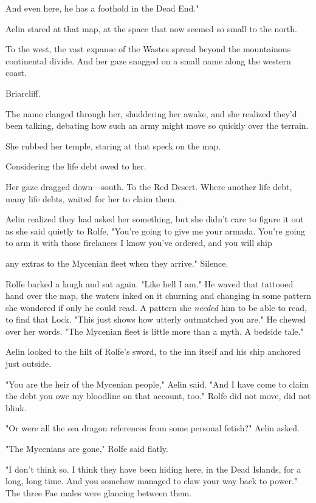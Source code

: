 And even here, he has a foothold in the Dead End."

Aelin stared at that map, at the space that now seemed so small to the north.

To the west, the vast expanse of the Wastes spread beyond the mountainous continental divide. And her gaze snagged on a small name along the western coast.

Briarcliff.

The name clanged through her, shuddering her awake, and she realized they'd been talking, debating how such an army might move so quickly over the terrain.

She rubbed her temple, staring at that speck on the map.

Considering the life debt owed to her.

Her gaze dragged down---south. To the Red Desert. Where another life debt, many life debts, waited for her to claim them.

Aelin realized they had asked her something, but she didn't care to figure it out as she said quietly to Rolfe, "You're going to give me your armada. You're going to arm it with those firelances I know you've ordered, and you will ship

any extras to the Mycenian fleet when they arrive." Silence.

Rolfe barked a laugh and sat again. "Like hell I am." He waved that tattooed hand over the map, the waters inked on it churning and changing in some pattern she wondered if only he could read. A pattern she
\emph{needed} him to be able to read, to find that Lock. "This just shows how utterly outmatched you are." He chewed over her words. "The Mycenian fleet is little more than a myth. A bedside tale."

Aelin looked to the hilt of Rolfe's sword, to the inn itself and his ship anchored just outside.

"You are the heir of the Mycenian people," Aelin said. "And I have come to claim the debt you owe my bloodline on that account, too." Rolfe did not move, did not blink.

"Or were all the sea dragon references from some personal fetish?" Aelin asked.

"The Mycenians are gone," Rolfe said flatly.

"I don't think so. I think they have been hiding here, in the Dead Islands, for a long, long time. And you somehow managed to claw your way back to power." The three Fae males were glancing between them.

